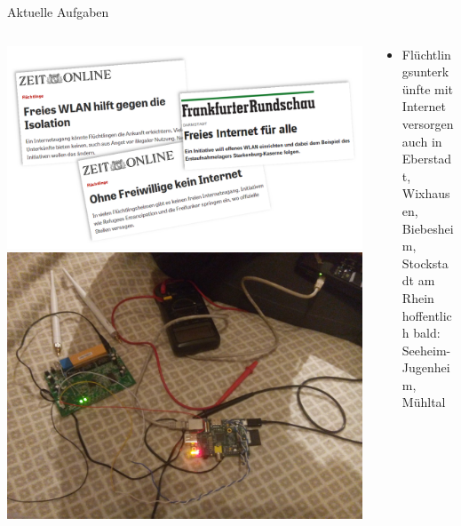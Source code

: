 \documentclass[10pt]{beamer}
\begin{document}
    \begin{frame}{Aktuelle Aufgaben}
      \begin{columns}[T]
        \begin{column}{5cm}
          \includegraphics[width=\textwidth]{images/2015-10_presse-fluechtlinge}
          \vspace{1em}
          \includegraphics[width=\textwidth]{images/disassemble}
        \end{column}
        \begin{column}{7cm}
        \begin{itemize}
          \item \large Flüchtlingsunterkünfte mit Internet versorgen\\
            \tiny auch in Eberstadt, Wixhausen, Biebesheim, Stockstadt am Rhein\\
            \tiny hoffentlich bald: Seeheim-Jugenheim, Mühltal

\end{itemize}
\end{column}
\end{columns}
\end{frame}
\end{document}
